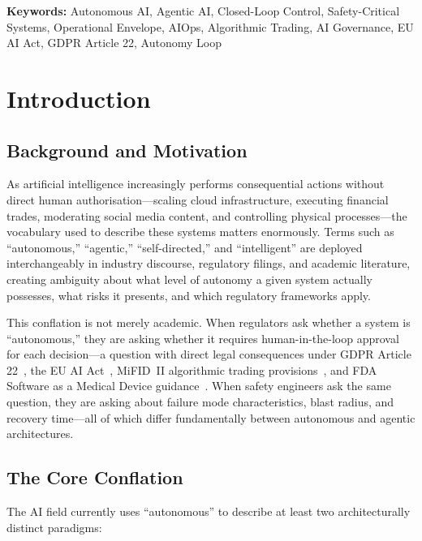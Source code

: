 \documentclass[12pt, a4paper]{article}
\begin{document}
\noindent\textbf{Keywords:} Autonomous AI, Agentic AI, Closed-Loop Control, Safety-Critical Systems, Operational Envelope, AIOps, Algorithmic Trading, AI Governance, EU AI Act, GDPR Article 22, Autonomy Loop

\newpage

\section{Introduction}\label{sec:intro}

\subsection{Background and Motivation}
As artificial intelligence increasingly performs consequential actions without direct human authorisation---scaling cloud infrastructure, executing financial trades, moderating social media content, and controlling physical processes---the vocabulary used to describe these systems matters enormously. Terms such as ``autonomous,'' ``agentic,'' ``self-directed,'' and ``intelligent'' are deployed interchangeably in industry discourse, regulatory filings, and academic literature, creating ambiguity about what level of autonomy a given system actually possesses, what risks it presents, and which regulatory frameworks apply.

This conflation is not merely academic. When regulators ask whether a system is ``autonomous,'' they are asking whether it requires human-in-the-loop approval for each decision---a question with direct legal consequences under GDPR Article 22~\citep{eu2016gdpr}, the EU AI Act~\citep{eu2024aiact}, MiFID~II algorithmic trading provisions~\citep{mifid2014}, and FDA Software as a Medical Device guidance~\citep{fda2019samd}. When safety engineers ask the same question, they are asking about failure mode characteristics, blast radius, and recovery time---all of which differ fundamentally between autonomous and agentic architectures.

\subsection{The Core Conflation}
The AI field currently uses ``autonomous'' to describe at least two architecturally distinct paradigms:
\end{document}
